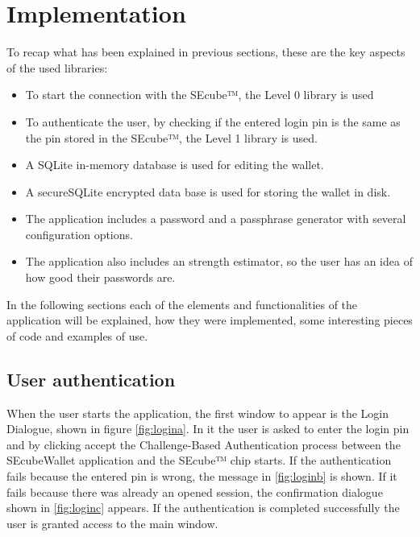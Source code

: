 \section{Implementation} \label{sec:imp}

To recap what has been explained in previous sections, these are the key aspects of the used libraries:

\begin{itemize}
\setlength\itemsep{0pt}

\item To start the connection with the SEcube™, the Level 0 library is used
\item To authenticate the user, by checking if the entered login pin is the same as the pin stored in the SEcube™, the Level 1 library is used.
\item A SQLite in-memory database is used for editing the wallet.
\item A secureSQLite encrypted data base is used for storing the wallet in disk.
\item The application includes a password and a passphrase generator with several configuration options.
\item The application also includes an strength estimator, so the user has an idea of how good their passwords are.

\end{itemize}

In the following sections each of the elements and functionalities of the application will be explained, how they were implemented, some interesting pieces of code and examples of use.

\subsection{User authentication} \label{sec:authen}

When the user starts the application, the first window to appear is the Login Dialogue, shown in figure \ref{fig:logina}. In it the user is asked to enter the login pin and by clicking accept the Challenge-Based Authentication process between the SEcubeWallet application and the SEcube™ chip starts. If the authentication fails because the entered pin is wrong, the message in \ref{fig:loginb} is shown. If it fails because there was already an opened session, the confirmation dialogue shown in \ref{fig:loginc} appears. If the authentication is completed successfully the user is granted access to the main window.

